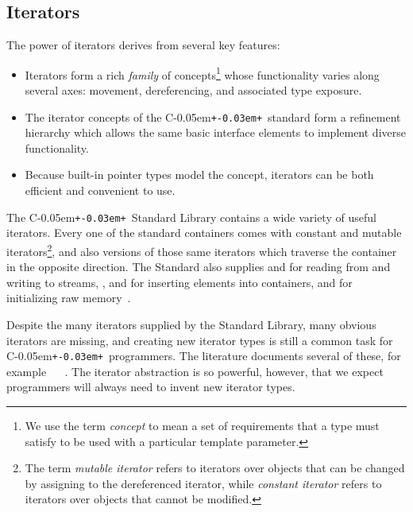 \documentclass{netobjectdays}
\newcommand{\Cpp}{C\kern-0.05em\texttt{+\kern-0.03em+}}
\begin{document}
\subsection{Iterators}

The power of iterators derives from several key
features:
\begin{itemize}
\item Iterators form a rich \emph{family} of concepts\footnote{We use
    the term \emph{concept} to mean a set of requirements that a type
    must satisfy to be used with a particular template parameter.}
  whose functionality varies along several axes: movement,
  dereferencing, and associated type exposure.
  
\item The iterator concepts of the \Cpp\ standard form a refinement
  hierarchy which allows the same basic interface elements to
  implement diverse functionality.
  
\item Because built-in pointer types model the
   concept, iterators can be both
  efficient and convenient to use.
\end{itemize}

The \Cpp\ Standard Library contains a wide variety of useful
iterators. Every one of the standard containers comes with constant
and mutable iterators\footnote{The term \emph{mutable iterator} refers
to iterators over objects that can be changed by assigning to the
dereferenced iterator, while \emph{constant iterator} refers to
iterators over objects that cannot be modified.}, and also
 versions of those same iterators which traverse the
container in the opposite direction. The Standard also supplies
 and  for reading
from and writing to streams, ,
 and  for
inserting elements into containers, and
 for initializing raw
memory~\cite{iso98:_cpp_final_draft_standard}.

Despite the many iterators supplied by the Standard Library, many
obvious iterators are missing, and creating new iterator types is
still a common task for \Cpp\ programmers. The literature documents
several of these, for example
~\cite{austern99:_gener_progr_stl}
~\cite{koenig97:_rumin_cpp}. The iterator
abstraction is so powerful, however, that we expect programmers will
always need to invent new iterator types.
\end{document}
